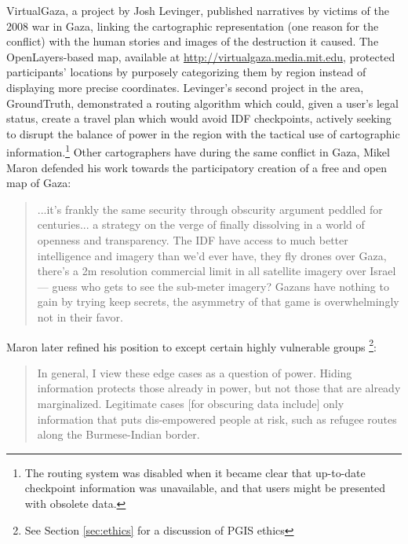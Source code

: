 \documentclass[11pt,oneside,notitlepage]{report}
\begin{document}
{{VirtualGaza, a project by Josh Levinger, published narratives by victims of the 2008 war in Gaza, linking the cartographic representation (one reason for the conflict) with the human stories and images of the destruction it caused. The OpenLayers-based map, available at \url{http://virtualgaza.media.mit.edu}, protected participants' locations by purposely categorizing them by region instead of displaying more precise coordinates. Levinger's second project in the area, GroundTruth, demonstrated a routing algorithm which could, given a user's legal status, create a travel plan which would avoid IDF checkpoints, actively seeking to disrupt the balance of power in the region with the tactical use of cartographic information.\footnote{The routing system was disabled when it became clear that up-to-date checkpoint information was unavailable, and that users might be presented with obsolete data.} Other cartographers have during the same conflict in Gaza, Mikel Maron defended his work towards the participatory creation of a free and open map of Gaza:  

\begin{quote}
...it's frankly the same security through obscurity argument peddled for centuries... a strategy on the verge of finally dissolving in a world of openness and transparency. The IDF have access to much better intelligence and imagery than we'd ever have, they fly drones over Gaza, there's a 2m resolution commercial limit in all satellite imagery over Israel --- guess who gets to see the sub-meter imagery? Gazans have nothing to gain by trying keep secrets, the asymmetry of that game is overwhelmingly not in their favor. \cite{maron2009misconceptions}
\end{quote}

Maron later refined his position to except certain highly vulnerable groups \footnote{See Section \ref{sec:ethics} for a discussion of \ac{PGIS} ethics}:

\begin{quote}
In general, I view these edge cases as a question of power. Hiding information protects those already in power, but not those that are already marginalized. Legitimate cases [for obscuring data include] only information that puts dis-empowered people at risk, such as refugee routes along the Burmese-Indian border. \cite{maron2010freedom}
\end{quote}

}}
\end{document}
